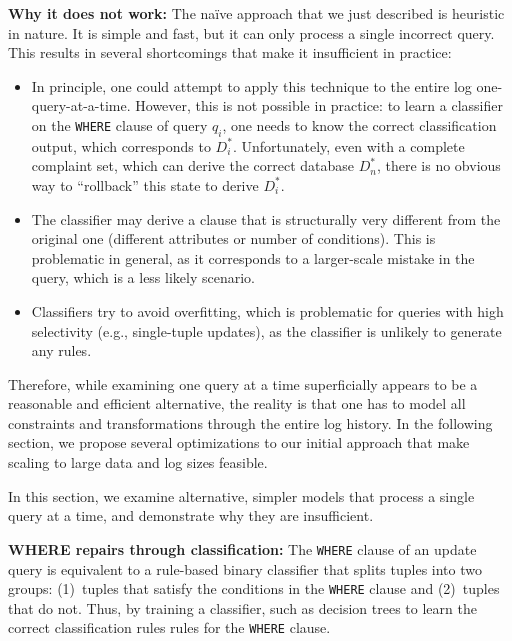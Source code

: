 \smallskip
\noindent
\textbf{Why it does not work:}
The na\"ive approach that we just described is heuristic in nature. It
is simple and fast, but it can only process a single incorrect query.
This results in several shortcomings that make it insufficient in
practice:
\begin{itemize}[itemsep=1pt, leftmargin=5mm]
    
\item In principle, one could attempt to apply this technique to the
entire log one-query-at-a-time. However, this is not possible in
practice: to learn a classifier on the \texttt{WHERE} clause of query
$q_i$, one needs to know the correct classification output, which
corresponds to $D_i^*$. Unfortunately, even with a complete complaint
set, which can derive the correct database $D_n^*$, there is no
obvious way to ``rollback'' this state to derive $D_i^*$.

\item The classifier may derive a clause that is structurally very
different from the original one (different attributes or number of
conditions). This is problematic in general, as it corresponds to a
larger-scale mistake in the query, which is a less likely scenario.

\item Classifiers try to avoid overfitting, which is problematic for
queries with high selectivity (e.g., single-tuple updates), as the
classifier is unlikely to generate any rules.

\end{itemize}


Therefore, while examining one query at a time superficially appears
to be a reasonable and efficient alternative, the reality is that one
has to model all constraints and transformations through the entire
log history. In the following section, we propose several
optimizations to our initial approach that make scaling to large data
and log sizes feasible. 


\iffalse
In this
section, we examine alternative, simpler models that process a single
query at a time, and demonstrate why they are insufficient.

\noindent
\textbf{WHERE repairs through classification:}
The \texttt{WHERE} clause of an update query is equivalent to a
rule-based binary classifier that splits tuples into two groups:
(1)~tuples that satisfy the conditions in the \texttt{WHERE} clause
and (2)~tuples that do not. Thus, by training a classifier,
such as decision trees \cite{quinlan1987} to learn
the correct classification rules rules for the \texttt{WHERE} clause.

